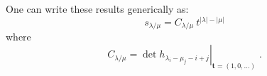 One can write these results generically as:
\begin{equation}
\boxed{s_{\lambda/\mu} = C_{\lambda/\mu}\ t^{|\lambda| - |\mu|}}	
\end{equation}
where 
\begin{equation}
C_{\lambda/\mu} = \left.\det h_{\lambda_i - \mu_j -i +j}\right|_{\mathbf{t}=(1, 0, \dots )}\; .
\end{equation}


